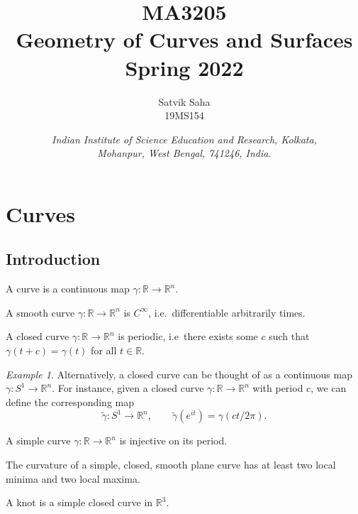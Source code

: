 \documentclass[11pt]{article}
\title{
    \Large\textsc{MA3205} \\
    \Huge \textbf{Geometry of Curves and Surfaces} \\
    \vspace{5pt}
    \Large{Spring 2022}
}
\author{
    \large Satvik Saha
    \\\textsc{\small 19MS154}
}
\date{\normalsize
    \textit{Indian Institute of Science Education and Research, Kolkata, \\
    Mohanpur, West Bengal, 741246, India.} \\
}
\newcommand{\R}{\mathbb{R}}
\theoremstyle{definition}
\theoremstyle{remark}
\newtheorem*{example}{Example}
\numberwithin{equation}{section}
\begin{document}
    \maketitle

    \tableofcontents
    
    \section{Curves}
    
    \subsection{Introduction}
    
    \begin{definition}
        A curve is a continuous map $\gamma\colon \R \to \R^n$.
    \end{definition}

    \begin{definition}
        A smooth curve $\gamma\colon \R \to \R^n$ is $C^\infty$, i.e.\ differentiable
        arbitrarily times.
    \end{definition}

    \begin{definition}
        A closed curve $\gamma\colon \R \to \R^n$ is periodic, i.e\ there exists some
        $c$ such that $\gamma(t + c) = \gamma(t)$ for all $t \in \R$.
    \end{definition}
    \begin{example}
        Alternatively, a closed curve can be thought of as a continuous map
        $\gamma\colon S^1 \to \R^n$. For instance, given a closed curve $\gamma\colon
        \R \to \R^n$ with period $c$, we can define the corresponding map \[
            \tilde{\gamma}\colon S^1 \to \R^n, \qquad \tilde{\gamma}(e^{it}) =
            \gamma(ct / 2\pi).
        \] 
    \end{example}

    \begin{definition}
        A simple curve $\gamma\colon \R \to \R^n$ is injective on its period.
    \end{definition}

    \begin{theorem}
        The curvature of a simple, closed, smooth plane curve has at least two local
        minima and two local maxima.
    \end{theorem}


    \begin{definition}
        A knot is a simple closed curve in $\R^3$.
    \end{definition}
\end{document}
